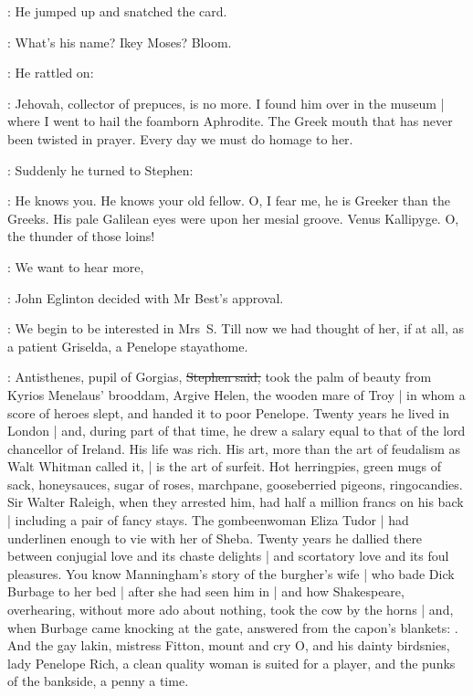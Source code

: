 :
He jumped up and snatched the card.

\mulligan:
What's his name?
Ikey Moses?
Bloom.

:
He rattled on:

\mulligan:
Jehovah,
collector of prepuces,
is no more.
I found him over in the museum |
where I went to hail the foamborn Aphrodite.
The Greek mouth that has never been twisted in prayer.
Every day we must do homage to her.

:
Suddenly he turned to Stephen:

\mulligan:
He knows you.
He knows your old fellow.
O, I fear me,
he is Greeker than the Greeks.
His pale Galilean eyes were upon her mesial groove.
Venus Kallipyge.
O, the thunder of those loins!

\eglinton:
We want to hear more,

:
John Eglinton decided with Mr Best's approval.

\eglinton:
We begin to be interested in Mrs~S.
Till now we had thought of her,
if at all,
as a patient Griselda,
a Penelope stayathome.

\Stephen:
Antisthenes, pupil of Gorgias,
\sout{Stephen said,}
took the palm of beauty from Kyrios Menelaus' brooddam,
Argive Helen, the wooden mare of Troy |
in whom a score of heroes slept,
and handed it to poor Penelope.
Twenty years he lived in London |
and, during part of that time,
he drew a salary equal to that of the lord chancellor of Ireland.
His life was rich.
His art,
more than the art of feudalism as Walt Whitman called it, |
is the art of surfeit.
Hot herringpies,
green mugs of sack,
honeysauces,
sugar of roses,
marchpane,
gooseberried pigeons,
ringocandies.
Sir Walter Raleigh,
when they arrested him,
had half a million francs on his back |
including a pair of fancy stays.
The gombeenwoman Eliza Tudor |
had underlinen enough to vie with her of Sheba.
Twenty years he dallied there between conjugial love and its chaste delights |
and scortatory love and its foul pleasures.
You know Manningham's story of the burgher's wife |
who bade Dick Burbage to her bed |
after she had seen him in  |
and how Shakespeare,
overhearing,
without more ado about nothing,
took the cow by the horns |
and, when Burbage came knocking at the gate,
answered from the capon's blankets:
.
And the gay lakin,
mistress Fitton,
mount and cry O,
and his dainty birdsnies,
lady Penelope Rich,
a clean quality woman is suited for a player,
and the punks of the bankside,
a penny a time.

